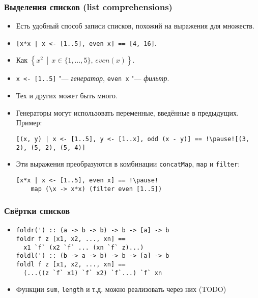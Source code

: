 \documentclass[11pt]{beamer}
\begin{document}
\begin{frame}[fragile]
  \frametitle{Выделения списков (list comprehensions)}
  \begin{itemize}
    \item Есть удобный способ записи списков, похожий на выражения для множеств.
    \item[] \lstinline![x*x | x <- [1..5], even x] == !\pause \lstinline|[4, 16]|.
    \item Как \(\left\{x^2\,\middle|\,x \in \{1, \ldots, 5\},\,even(x)\right\}\).
    \item \lstinline!x <- [1..5]! "--- \emph{генератор}, \lstinline|even x| "--- \emph{фильтр}.
          \pause
    \item Тех и других может быть много.
    \item Генераторы могут использовать переменные, введённые в предыдущих. Пример:
          \begin{lstlisting}[basicstyle=\ttfamily\footnotesize]
[(x, y) | x <- [1..5], y <- [1..x], odd (x - y)] == !\pause![(3, 2), (5, 2), (5, 4)]
\end{lstlisting}
    \item Эти выражения преобразуются в комбинации \lstinline|concatMap|, \lstinline|map| и \lstinline|filter|:
          \begin{lstlisting}[basicstyle=\ttfamily\footnotesize]
[x*x | x <- [1..5], even x] == !\pause!
    map (\x -> x*x) (filter even [1..5])
\end{lstlisting}
  \end{itemize}
\end{frame}

\begin{frame}[fragile]
  \frametitle{Свёртки списков}
  \begin{itemize}
    \item
          \begin{lstlisting}
foldr(') :: (a -> b -> b) -> b -> [a] -> b
foldr f z [x1, x2, ..., xn] == 
  x1 `f` (x2 `f` ... (xn `f` z)...)
foldl(') :: (b -> a -> b) -> b -> [a] -> b
foldl f z [x1, x2, ..., xn] == 
  (...((z `f` x1) `f` x2) `f`...) `f` xn
\end{lstlisting}
    \item Функции \lstinline|sum|, \lstinline|length| и т.д. можно реализовать через них (TODO)
  \end{itemize}
\end{frame}
\end{document}

